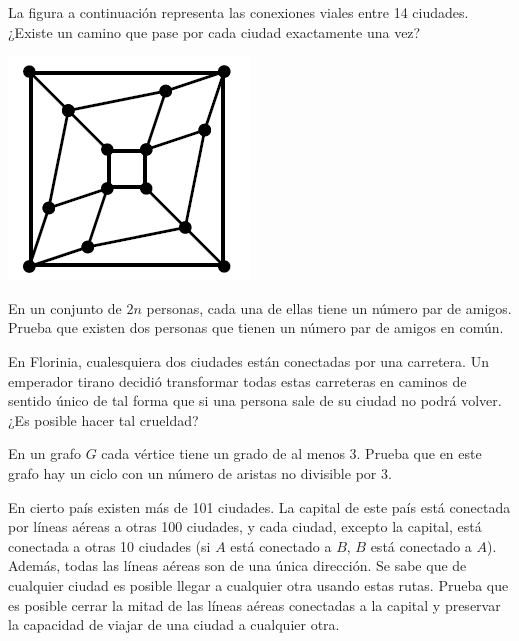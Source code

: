 \documentclass[11pt]{scrartcl}
\begin{document}
\begin{problem}
La figura a continuación representa las conexiones viales entre 14 ciudades. ¿Existe un camino que pase por cada ciudad exactamente una vez?
\begin{center}
    \includegraphics[scale=0.75]{images/clase_10_grafo_6.png}
\end{center}
\end{problem}

\begin{problem}
En un conjunto de \( 2n \) personas, cada una de ellas tiene un número par de amigos. Prueba que existen dos personas que tienen un número par de amigos en común.
\end{problem}

\begin{problem}
En Florinia, cualesquiera dos ciudades están conectadas por una carretera. Un emperador tirano decidió transformar todas estas carreteras en caminos de sentido único de tal forma que si una persona sale de su ciudad no podrá volver. ¿Es posible hacer tal crueldad?
\end{problem}

\begin{problem}
En un grafo \( G \) cada vértice tiene un grado de al menos 3. Prueba que en este grafo hay un ciclo con un número de aristas no divisible por 3.

\end{problem}

\begin{problem}
En cierto país existen más de 101 ciudades. La capital de este país está conectada por líneas aéreas a otras 100 ciudades, y cada ciudad, excepto la capital, está conectada a otras 10 ciudades (si \( A \) está conectado a \( B \), \( B \) está conectado a \( A \)). Además, todas las líneas aéreas son de una única dirección. Se sabe que de cualquier ciudad es posible llegar a cualquier otra usando estas rutas. Prueba que es posible cerrar la mitad de las líneas aéreas conectadas a la capital y preservar la capacidad de viajar de una ciudad a cualquier otra.
\end{problem}
\end{document}
